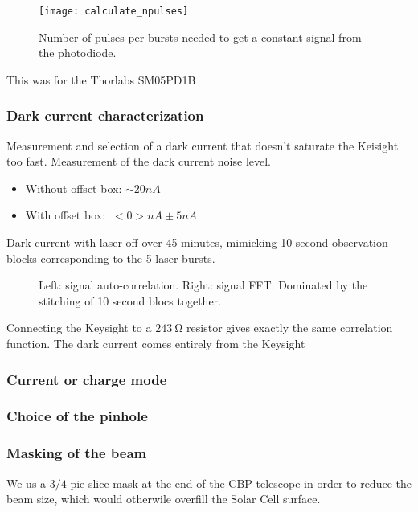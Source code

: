 \documentclass[onecolumn]{aa}
\newcommand{\Oldthorlabs}{SM05PD1B}
\begin{document}
\begin{figure}[!ht]
\begin{center}
\texttt{[image: calculate\_npulses]}
\end{center}
\caption[]{Number of pulses per bursts needed to get a constant signal from the photodiode.}
\label{fig:calculate_npulses}
\end{figure}

This was for the Thorlabs \Oldthorlabs


\subsubsection{Dark current characterization}

Measurement and selection of a dark current that doesn't saturate the Keisight
too fast. Measurement of the dark current noise level. 

\begin{itemize}
\item Without offset box: $\sim 20 nA$
\item With offset box: $~ <0> nA \pm 5 nA$
\end{itemize}


Dark current with laser off over 45 minutes, mimicking 10 second observation
blocks corresponding to the 5 laser bursts.
\begin{figure}[!ht]
\begin{center}
\end{center}
\caption[]{Left: signal auto-correlation. Right: signal FFT. Dominated by the
  stitching of 10 second blocs together.}
\label{fig:darkcurrentspectrum}
\end{figure}

Connecting the Keysight to a $\SI{243}{\ohm}$ resistor gives exactly the same
correlation function. The dark current comes entirely from the Keysight


\subsubsection{Current or charge mode}

\subsubsection{Choice of the pinhole}

\subsubsection{Masking of the beam}
We us a $3/4$ pie-slice mask at the end of the CBP telescope in order to reduce
the beam size, which would otherwile overfill the Solar Cell surface.
\end{document}
